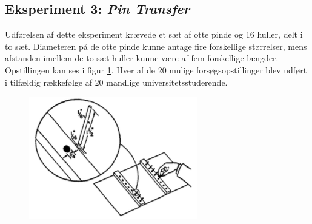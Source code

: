 \subsection*{Eksperiment 3: \textit{Pin Transfer}}
Udførelsen af dette eksperiment krævede et sæt af otte pinde og 16 huller, delt i to sæt. Diameteren på de otte pinde kunne antage fire forskellige størrelser, mens afstanden imellem de to sæt huller kunne være af fem forskellige længder. Opstillingen kan ses i figur \ref{fig:FittsEx3}.
Hver af de 20 mulige forsøgsopstillinger blev udført i tilfældig rækkefølge af 20 mandlige universitetsstuderende.
\begin{figure}[h]
\centering
\includegraphics[width=0.5\linewidth]{images/illustrations/fitt_ex3}
\label{fig:FittsEx3}
\end{figure}

